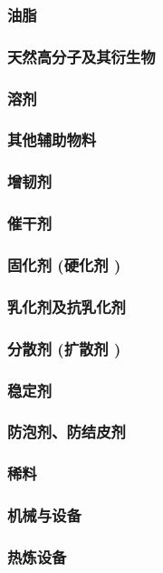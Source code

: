 \documentclass[UTF8]{../../ApplicationUniverse}
\begin{document}
        \subsubsection{油脂}
        \subsubsection{天然高分子及其衍生物}
        \subsubsection{溶剂}
        \subsubsection{其他辅助物料}
            \subsubsection{增韧剂}
            \subsubsection{催干剂}
            \subsubsection{固化剂 (硬化剂 )}
            \subsubsection{乳化剂及抗乳化剂}
            \subsubsection{分散剂 (扩散剂 )}
            \subsubsection{稳定剂}
            \subsubsection{防泡剂、防结皮剂}
            \subsubsection{稀料}
    \subsubsection{机械与设备}
        \subsubsection{热炼设备}
\end{document}
